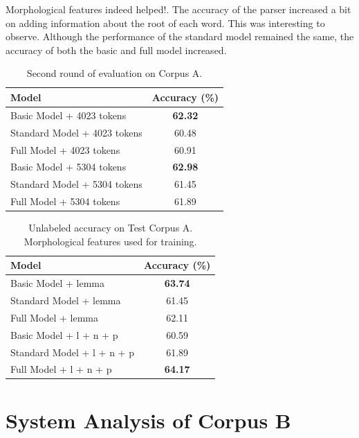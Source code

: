\documentclass[11pt,letterpaper]{article}
\begin{document}
Morphological features indeed helped!. The accuracy of the parser increased a bit on adding information about the root of each word. This was interesting to observe. Although the performance of the standard model remained the same, the accuracy of both the basic and full model increased. 


\begin{table}
\begin{center}
  \begin{tabular}{ l || c }
  \hline
  Model & Accuracy (\%)\\
  \hline
  Basic Model + 4023 tokens & \textbf{62.32} \\
  Standard Model + 4023 tokens & 60.48 \\
  Full Model + 4023 tokens & 60.91 \\
  Basic Model + 5304 tokens & \textbf{62.98} \\
  Standard Model + 5304 tokens & 61.45 \\
  Full Model + 5304 tokens & 61.89\\
  \hline
   \end{tabular}
\end{center}
\caption{Second round of evaluation on Corpus A.}
\label{Second}
\end{table}



\begin{table}
\begin{center}
  \begin{tabular}{ l || c }
  \hline
  Model & Accuracy (\%)\\
  \hline
  Basic Model + lemma& \textbf{63.74} \\
  Standard Model + lemma& 61.45 \\
  Full Model + lemma& 62.11 \\
  \hline
  Basic Model + l + n + p& 60.59 \\
  Standard Model + l + n + p& 61.89 \\
  Full Model + l + n + p& \textbf{64.17} \\
  \hline
   \end{tabular}
\end{center}
\caption{Unlabeled accuracy on Test Corpus A. Morphological features used for training.}
\label{Third}
\end{table}

\section{System Analysis of Corpus B}
\end{document}
